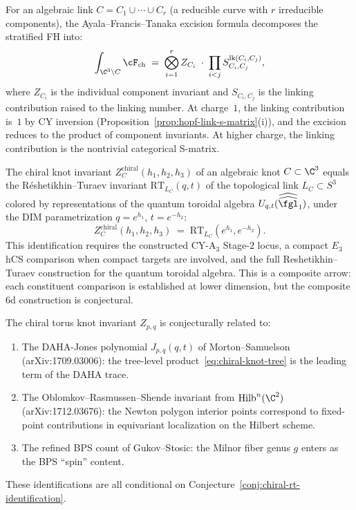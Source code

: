 For an algebraic link $C = C_1 \cup \cdots \cup C_r$ (a reducible curve with $r$ irreducible components), the Ayala--Francis--Tanaka excision formula decomposes the stratified FH into:
\[
 \int_{\C^3 \setminus C} \cF_{\mathrm{ch}} \;=\; \bigotimes_{i=1}^{r} Z_{C_i} \;\cdot\; \prod_{i < j} S_{C_i, C_j}^{\mathrm{lk}(C_i, C_j)},
\]
where $Z_{C_i}$ is the individual component invariant and $S_{C_i, C_j}$ is the linking contribution raised to the linking number. At charge~$1$, the linking contribution is~$1$ by CY inversion (Proposition~\ref{prop:hopf-link-s-matrix}(i)), and the excision reduces to the product of component invariants. At higher charge, the linking contribution is the nontrivial categorical S-matrix.

\begin{conjecture}
\label{conj:chiral-rt-identification}
\ClaimStatusConjectured
The chiral knot invariant $Z_C^{\mathrm{chiral}}(h_1, h_2, h_3)$ of an algebraic knot $C \subset \C^3$ equals the R\'{e}shetikhin--Turaev invariant $\mathrm{RT}_{L_C}(q, t)$ of the topological link $L_C \subset S^3$ colored by representations of the quantum toroidal algebra $U_{q,t}(\widehat{\widehat{\fgl}}_1)$, under the DIM parametrization $q = e^{h_1}$, $t = e^{-h_2}$:
\[
 Z_C^{\mathrm{chiral}}(h_1, h_2, h_3) \;=\; \mathrm{RT}_{L_C}(e^{h_1}, e^{-h_2}).
\]
This identification requires the constructed CY-A$_3$ Stage-$2$ locus, a compact $E_3$ hCS comparison when compact targets are involved, and the full Reshetikhin--Turaev construction for the quantum toroidal algebra. This is a composite arrow: each constituent comparison is established at lower dimension, but the composite 6d construction is conjectural.
\end{conjecture}

\begin{remark}
\label{rem:daha-hilb-connection}
The chiral torus knot invariant $Z_{p,q}$ is conjecturally related to:
\begin{enumerate}[label=\textup{(\alph*)}]
 \item The DAHA-Jones polynomial $J_{p,q}(q,t)$ of Morton--Samuelson (arXiv:1709.03006): the tree-level product~\eqref{eq:chiral-knot-tree} is the leading term of the DAHA trace.
 \item The Oblomkov--Rasmussen--Shende invariant from $\mathrm{Hilb}^n(\C^2)$ (arXiv:1712.03676): the Newton polygon interior points correspond to fixed-point contributions in equivariant localization on the Hilbert scheme.
 \item The refined BPS count of Gukov--Stosic: the Milnor fiber genus $g$ enters as the BPS ``spin'' content.
\end{enumerate}
These identifications are all conditional on Conjecture~\ref{conj:chiral-rt-identification}.
\end{remark}

